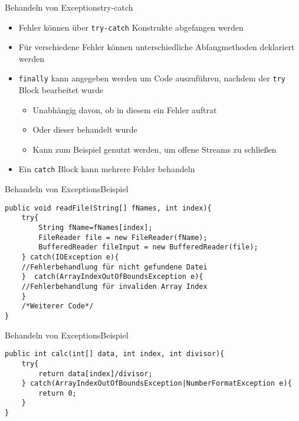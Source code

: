 \begin{frame}{Behandeln von Exceptions}{try-catch}
    \begin{itemize}[<+->]
        \item Fehler können über \texttt{try-catch} Konstrukte abgefangen werden
        \item Für verschiedene Fehler können unterschiedliche Abfangmethoden deklariert werden
        \item \texttt{finally} kann angegeben werden um Code auszuführen, nachdem der \texttt{try} Block bearbeitet wurde
        \begin{itemize}
            \item Unabhängig davon, ob in diesem ein Fehler auftrat
            \item Oder dieser behandelt wurde
            \item Kann zum Beispiel genutzt werden, um offene Streams zu schließen
        \end{itemize}
        \item Ein \texttt{catch} Block kann mehrere Fehler behandeln
    \end{itemize}
\end{frame}

\begin{frame}[fragile]{Behandeln von Exceptions}{Beispiel}
\lstset{style=java}
\begin{lstlisting}
public void readFile(String[] fNames, int index){
    try{
        String fName=fNames[index];
        FileReader file = new FileReader(fName); 
        BufferedReader fileInput = new BufferedReader(file); 
    } catch(IOException e){
    //Fehlerbehandlung für nicht gefundene Datei
    }  catch(ArrayIndexOutOfBoundsException e){
    //Fehlerbehandlung für invaliden Array Index
    }
    /*Weiterer Code*/
}
\end{lstlisting}
\end{frame}

\begin{frame}[fragile]{Behandeln von Exceptions}{Beispiel}
\lstset{style=java}
\begin{lstlisting}
public int calc(int[] data, int index, int divisor){
    try{
        return data[index]/divisor;
    } catch(ArrayIndexOutOfBoundsException|NumberFormatException e){
        return 0;
    }
}
\end{lstlisting}
\end{frame}

